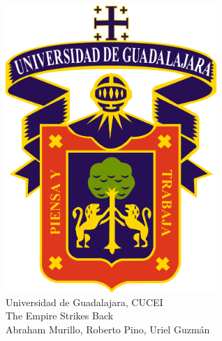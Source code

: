 \documentclass{article} %
\begin{document}
  

\pagestyle{empty}
  \begin{center}
    \strut %
    \includegraphics[width=8cm]{udg.png} \\
    {\Huge Universidad de Guadalajara, CUCEI\\}
    {\fontsize{60}{60}\selectfont The Empire Strikes Back\\}
    \vspace{0.5cm}
    {\Large Abraham Murillo, Roberto Pino, Uriel Guzmán\\}
    \vfill
    \vspace{0.5cm}
    \vspace{1cm}
  \end{center}
\clearpage
\pagestyle{fancy}
  
\end{document}

